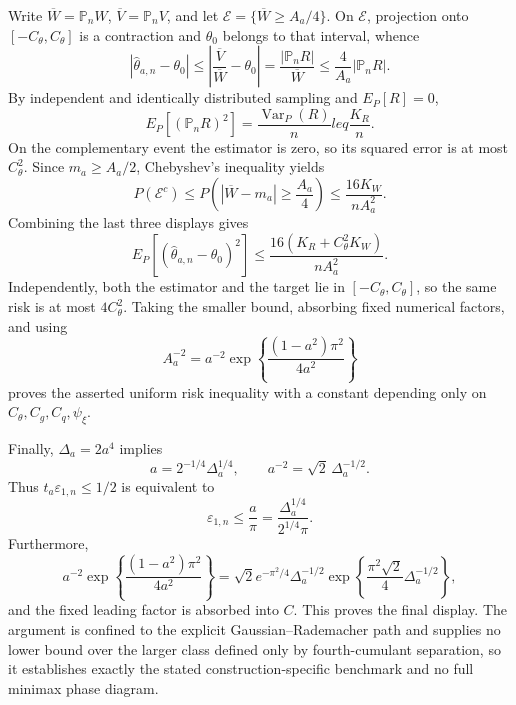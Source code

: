 Write \(\overline W=\mathbb P_nW\), \(\overline V=\mathbb P_nV\), and let \(\mathcal E=\{\overline W\geq A_a/4\}\).  On \(\mathcal E\), projection onto \([-C_{\theta},C_{\theta}]\) is a contraction and \(\theta_0\) belongs to that interval, whence
\[
 |\widehat\theta_{a,n}-\theta_0|
 \leq\left|\frac{\overline V}{\overline W}-\theta_0\right|
 =\frac{|\mathbb P_nR|}{\overline W}
 \leq\frac{4}{A_a}|\mathbb P_nR|.
\]
By independent and identically distributed sampling and \(E_P[R]=0\),
\[
 E_P[(\mathbb P_nR)^2]=\frac{\operatorname{Var}_P(R)}{n}leq\frac{K_R}{n}.
\]
On the complementary event the estimator is zero, so its squared error is at most \(C_{\theta}^2\).  Since \(m_a\geq A_a/2\), Chebyshev's inequality yields
\[
 P(\mathcal E^c)
 \leq P\!\left(|\overline W-m_a|\geq\frac{A_a}{4}\right)
 \leq\frac{16K_W}{nA_a^2}.
\]
Combining the last three displays gives
\[
 E_P[(\widehat\theta_{a,n}-\theta_0)^2]
 \leq\frac{16(K_R+C_{\theta}^2K_W)}{nA_a^2}.
\]
Independently, both the estimator and the target lie in \([-C_{\theta},C_{\theta}]\), so the same risk is at most \(4C_{\theta}^2\).  Taking the smaller bound, absorbing fixed numerical factors, and using
\[
 A_a^{-2}
 =a^{-2}\exp\!\left\{\frac{(1-a^2)\pi^2}{4a^2}\right\}
\]
proves the asserted uniform risk inequality with a constant depending only on \(C_{\theta},C_g,C_q,\psi_{\xi}\).

Finally, \(\Delta_a=2a^4\) implies
\[
 a=2^{-1/4}\Delta_a^{1/4},
 \qquad
 a^{-2}=\sqrt2\,\Delta_a^{-1/2}.
\]
Thus \(t_a\varepsilon_{1,n}\leq1/2\) is equivalent to
\[
 \varepsilon_{1,n}\leq\frac{a}{\pi}
 =\frac{\Delta_a^{1/4}}{2^{1/4}\pi}.
\]
Furthermore,
\[
 a^{-2}\exp\!\left\{\frac{(1-a^2)\pi^2}{4a^2}\right\}
 =\sqrt2e^{-\pi^2/4}\Delta_a^{-1/2}
 \exp\!\left\{\frac{\pi^2\sqrt2}{4}\Delta_a^{-1/2}\right\},
\]
and the fixed leading factor is absorbed into \(C\).  This proves the final display.  The argument is confined to the explicit Gaussian--Rademacher path and supplies no lower bound over the larger class defined only by fourth-cumulant separation, so it establishes exactly the stated construction-specific benchmark and no full minimax phase diagram.